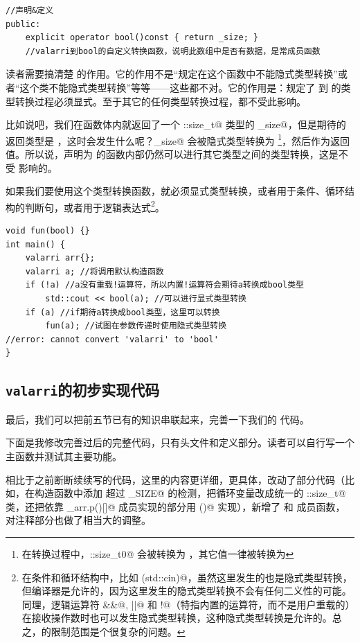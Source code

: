 \begin{lstlisting}
//声明&定义
public:
    explicit operator bool()const { return _size; }
    //valarri到bool的自定义转换函数，说明此数组中是否有数据，是常成员函数
\end{lstlisting}\par
读者需要搞清楚 \lstinline@explicit@ 的作用。它的作用不是``规定在这个函数中不能隐式类型转换''或者``这个类不能隐式类型转换''等等——这些都不对。它的作用是：规定了 \lstinline@valarri@ 到 \lstinline@bool@ 的类型转换过程必须显式。至于其它的任何类型转换过程，都不受此影响。\par
比如说吧，我们在函数体内就返回了一个 \lstinline@std::size_t@ 类型的 \lstinline@_size@，但是期待的返回类型是 \lstinline@bool@，这时会发生什么呢？\lstinline@_size@ 会被隐式类型转换为 \lstinline@bool@\footnote{在转换过程中，\lstinline@std::size_t{0}@ 会被转换为 \lstinline@false@，其它值一律被转换为 \lstinline@true@}，然后作为返回值。所以说，声明为 \lstinline@explicit@ 的函数内部仍然可以进行其它类型之间的类型转换，这是不受 \lstinline@explicit@ 影响的。\par
如果我们要使用这个类型转换函数，就必须显式类型转换，或者用于条件、循环结构的判断句，或者用于逻辑表达式\footnote{在条件和循环结构中，比如 \lstinline@if(std::cin)@，虽然这里发生的也是隐式类型转换，但编译器是允许的，因为这里发生的隐式类型转换不会有任何二义性的可能。同理，逻辑运算符 \lstinline@&&@, \lstinline@||@ 和 \lstinline@!@（特指内置的运算符，而不是用户重载的）在接收操作数时也可以发生隐式类型转换，这种隐式类型转换是允许的。总之，\lstinline@explicit@ 的限制范围是个很复杂的问题。}。
\begin{lstlisting}
void fun(bool) {}
int main() {
    valarri arr{};
    valarri a; //将调用默认构造函数
    if (!a) //a没有重载!运算符，所以内置!运算符会期待a转换成bool类型
        std::cout << bool(a); //可以进行显式类型转换
    if (a) //if期待a转换成bool类型，这里可以转换
        fun(a); //试图在参数传递时使用隐式类型转换
//error: cannot convert 'valarri' to 'bool'
}
\end{lstlisting}
\subsection*{\texttt{valarri}的初步实现代码}
最后，我们可以把前五节已有的知识串联起来，完善一下我们的 \lstinline@valarri@ 代码。\par
下面是我修改完善过后的完整代码，只有头文件和定义部分。读者可以自行写一个主函数并测试其主要功能。\par
相比于之前断断续续写的代码，这里的内容更详细，更具体，改动了部分代码（比如，在构造函数中添加 \lstinline@size@ 超过 \lstinline@MAX_SIZE@ 的检测，把循环变量改成统一的 \lstinline@std::size_t@ 类，还把依靠 \lstinline@_arr.p()[]@ 成员实现的部分用 \lstinline@operator[]()@ 实现），新增了 \lstinline@resize@ 和 \lstinline@swap@ 成员函数，对注释部分也做了相当大的调整。

\newpage
